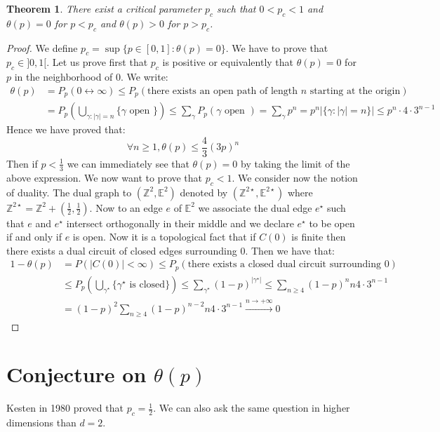 \documentclass[10pt,a4paper]{book}
\newtheorem{theorem}{Theorem}[section]
\theoremstyle{definition}
\begin{document}
\begin{theorem}

There exist a critical parameter $p_c$ such that $0 < p_c < 1$ and $\theta(p) = 0$ for $p < p_c$ and $\theta(p) > 0$ for $p > p_c$. 

\end{theorem}

\begin{proof}
We define $p_c = \sup \{ p \in [0, 1] : \theta(p) = 0 \}$. We have to prove that $p_c \in ]0, 1[$. Let us prove first that $p_c$ is positive or equivalently that $\theta(p) = 0$ for $p$ in the neighborhood of 0. We write:
\begin{align*}
\theta(p) &= P_p(0 \leftrightarrow \infty) \leq P_p(\mbox{there exists an open path of length~} n \mbox{~starting at the origin})\\
&= P_p\left( \bigcup_{\gamma : |\gamma| = n} \{\gamma \mbox{~open~}\} \right) \leq \sum_\gamma P_p(\gamma \mbox{~open~}) = \sum_\gamma p^n = p^n |\{\gamma : |\gamma| = n\}| \leq p^n \cdot 4 \cdot 3^{n-1} 
\end{align*}
Hence we have proved that:
\[
\forall n \geq 1, \theta(p) \leq \frac{4}{3} (3p)^n
\]
Then if $p < \frac{1}{3}$ we can immediately see that $\theta(p) = 0$ by taking the limit of the above expression. We now want to prove that $p_c < 1$. We consider now the notion of duality. The dual graph to $(\mathbb{Z}^2, \mathbb{E}^2)$ denoted by $(\mathbb{Z}^{2\star}, \mathbb{E}^{2\star})$ where $\mathbb{Z}^{2\star} = \mathbb{Z}^2 + (\frac{1}{2}, \frac{1}{2})$. Now to an edge $e$ of $\mathbb{E}^2$ we associate the dual edge $e^\star$ such that $e$ and $e^\star$ intersect orthogonally in their middle and we declare $e^\star$ to be open if and only if $e$ is open. Now it is a topological fact that if $C(0)$ is finite then there exists a dual circuit of closed edges surrounding $0$. Then we have that:
\begin{align*}
1 - \theta(p) &= P(|C(0)| < \infty) \leq P_p(\mbox{there exists a closed dual circuit surrounding 0}) \\
&\leq P_p \left( \bigcup_{\gamma^\star} \{\gamma^\star \mbox{~is closed}\} \right) \leq \sum_{\gamma^\star} (1 - p)^{|\gamma^\star|}  \leq \sum_{n \geq 4} (1 - p)^n n 4 \cdot 3^{n-1} \\
&= (1 - p)^2 \sum_{n \geq 4} (1 - p)^{n - 2} n 4\cdot  3^{n-1} \stackrel{n \to +\infty}{\longrightarrow} 0 
\end{align*}
\end{proof}

\section{Conjecture on $\theta(p)$}

Kesten in 1980 proved that $p_c = \frac{1}{2}$. We can also ask the same question in higher dimensions than $d = 2$. 
\end{document}
